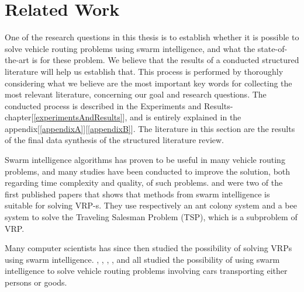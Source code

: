\section{Related Work}
\label{sec:relatedWork} 
One of the research questions in this thesis is to establish whether it is possible to solve vehicle routing problems using swarm intelligence, and what the state-of-the-art is for these problem. We believe that the results of a conducted structured literature will help us establish that. This process is performed by thoroughly considering what we believe are the most important key words for collecting the most relevant literature, concerning our goal and research questions. The conducted process is described in the Experiments and Results-chapter[\ref{experimentsAndResults}], and is entirely explained in the appendix[\ref{appendixA}][\ref{appendixB}]. The literature in this section are the results of the final data synthesis of the structured literature review. \newline

Swarm intelligence algorithms has proven to be useful in many vehicle routing problems, and many studies have been conducted to improve the solution, both regarding time complexity and quality, of such problems. \citet{dorigo97} and \citet{lucic03} were two of the first published papers that shows that methods from swarm intelligence is suitable for solving VRP-s. They use respectively an ant colony system and a bee system to solve the Traveling Salesman Problem (TSP), which is a subproblem of VRP. 

Many computer scientists has since then studied the possibility of solving VRPs using swarm intelligence. \citet{hsiao04}, \citet{salehi-nezhad07}, \citet{tripathi09}, \citet{dias14}, and \citet{sedighpour14} all studied the possibility of using swarm intelligence to solve vehicle routing problems involving cars transporting either persons or goods. 

